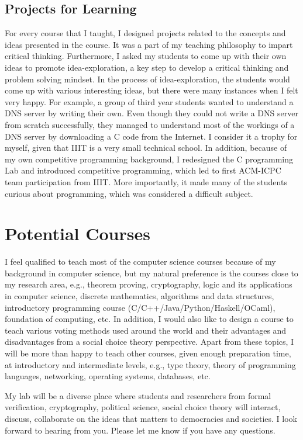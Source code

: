 \documentclass[11pt,a4paper,roman]{moderncv}
\begin{document}
\subsection{Projects for Learning}
For every course that I taught, I designed projects related to the concepts 
and ideas presented in the course. It was a part of my teaching philosophy to impart 
critical thinking. Furthermore, I asked my students to come up with their own ideas to 
promote idea-exploration, a key step to develop a critical thinking and problem solving mindset. 
In the process of idea-exploration, the students would come up with various interesting 
ideas, but there were many instances when I felt very happy. For example, a group of third year students  
wanted to understand a DNS server by writing their own. Even though they 
could not write a DNS server from scratch successfully, they managed to understand 
most of the workings of a DNS server by downloading a C code from the Internet. 
I consider it a trophy for myself, given that IIIT is a very small technical school. 
In addition, because of my own 
competitive programming background, 
I redesigned the C programming Lab and introduced competitive 
programming, which led to first ACM-ICPC team participation 
from IIIT. More importantly, it made many of the students curious about 
programming, which was considered a difficult subject.

\section{Potential Courses}
I feel qualified to teach most of the computer science courses 
because of my background in computer science, but 
my natural preference is the courses close to my research 
area, e.g., theorem proving, cryptography, logic 
and its applications in computer science, discrete 
mathematics, algorithms and data structures, 
introductory programming course (C/C++/Java/Python/Haskell/OCaml),
foundation of computing, etc. 
In addition, I would also like to design a course to teach 
various voting methods used around the world and 
their advantages and disadvantages from a social choice theory perspective. 
Apart from these topics, I will 
be more than happy to teach other courses, given enough 
preparation time, at introductory and 
intermediate levels, e.g., type theory, theory of programming 
languages, networking, operating systems, databases, etc.


My lab will be a diverse place where students and researchers from formal 
verification, cryptography, 
political science, social choice theory will interact, discuss, 
collaborate on the ideas that matters to democracies and societies.
I look forward to hearing from you. Please let me know if you have any questions. \\
 

\vspace{0.5cm}


\makeletterclosing
\end{document}

